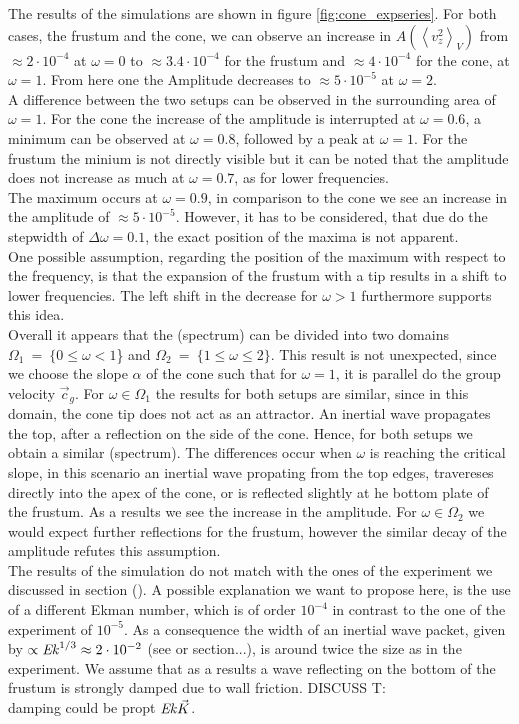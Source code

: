 The results of the simulations are shown in figure \ref{fig:cone_expseries}.
For both cases, the frustum and the cone, we can observe an increase in $A\left(\left<v^2_z\right>_V\right)$
from $\approx 2\cdot10^{-4}$ at $\omega=0$ to  $\approx 3.4\cdot10^{-4}$ for the frustum and $\approx 4\cdot10^{-4}$ for the cone,  at $\omega=1$.
From here one the Amplitude decreases to $\approx 5\cdot10^{-5}$ at $\omega=2$.\\
A difference between the two setups can be observed in the surrounding area of $\omega=1$.
For the cone the increase of the amplitude is interrupted at $\omega=0.6$, a minimum can be observed at $\omega=0.8$, followed by
a peak at $\omega=1$. For the frustum the minium is not directly visible but it can be noted that the
amplitude does not increase as much at $\omega=0.7$, as for lower frequencies.\\
The maximum occurs at $\omega=0.9$, in comparison to the cone we see an increase in the amplitude of $\approx 5\cdot10^{-5}$.
However, it has to be considered, that due do the stepwidth of $\Delta \omega = 0.1$, the exact position of the maxima is
not apparent.\\
One possible assumption, regarding the position of the maximum with respect to the frequency, is that
the expansion of the frustum with a tip  results in a shift to lower frequencies.
The left shift in the decrease for $\omega > 1$ furthermore supports this idea.\\
Overall it appears that the (spectrum) can be divided into two domains $\Omega_1~=~\{0\leq\omega<1$\} and $\Omega_2~=~\{1\leq\omega\leq2\}$.
This result is not unexpected, since we choose the slope $\alpha$ of the cone such that for $\omega=1$, it is parallel
do the group velocity $\vec{c}_{g}$.
For $\omega\in\Omega_1$ the results for both setups are similar, since in this domain, the cone tip does not act as an attractor.
An inertial wave propagates the top, after a reflection on the side of the cone.
Hence, for both setups we obtain a similar (spectrum).
The differences occur when $\omega$ is reaching the critical slope, in this scenario an inertial wave propating from the
top edges, travereses directly into the apex of the cone, or is reflected slightly at he bottom plate of the frustum.
As a results we see the increase in the amplitude.
For $\omega\in \Omega_2$ we would expect further reflections for the frustum, however the similar
decay of the amplitude refutes this assumption.\\
The results of the simulation do not match with the ones of the experiment we discussed in section ().
A possible explanation we want to propose here, is the use of a different Ekman number, which is of order $10^{-4}$ in contrast
to the one of the experiment of $10^{-5}$.
As a consequence the width of an inertial wave packet, given by $\propto \mbox{\textit{Ek}}^{1/3} \approx 2\cdot10^{-2}$ (see \citep{} or section...),
is around twice the size as in the experiment. We assume that as a results a wave reflecting on the bottom of the frustum
is strongly damped due to wall friction.
DISCUSS T:\\
damping  could be propt $\mbox{\textit{Ek}} \vec{K}$.


